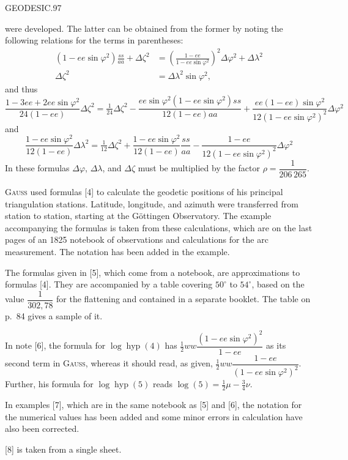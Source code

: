 \clearpage
\noindent\mbox{}\hfill GEODESIC.\hfill 97\par
{\small
\noindent were developed. The latter can be obtained from the former by noting the following relations for the terms in parentheses:
\[
\begin{aligned}
(1-ee\sin\varphi^2)\frac{ss}{aa}+\Delta\zeta^2&=\left(\frac{1-ee}{1-ee\sin\varphi^2}\right)^2\Delta\varphi^2+\Delta\lambda^2\\
\Delta\zeta^2&=\Delta\lambda^2\sin\varphi^2,
\end{aligned}
\]
and thus
\[
\frac{1-3ee+2ee\sin\varphi^2}{24(1-ee)}\Delta\zeta^2=\tfrac1{24}\Delta\zeta^2-\frac{ee\sin\varphi^2(1-ee\sin\varphi^2)ss}{12(1-ee)aa}+\frac{ee(1-ee)\sin\varphi^2}{12(1-ee\sin\varphi^2)^2}\Delta\varphi^2
\]
and
\[
\frac{1-ee\sin\varphi^2}{12(1-ee)}\Delta\lambda^2=\tfrac1{12}\Delta\zeta^2+\frac{1-ee\sin\varphi^2}{12(1-ee)}\frac{ss}{aa}-\frac{1-ee}{12(1-ee\sin\varphi^2)^2}\Delta\varphi^2
\]
In these formulas $\Delta\varphi$, $\Delta\lambda$, and $\Delta\zeta$ must be multiplied by the factor $\rho=\dfrac1{206\,265}$.

\textsc{Gauss} used formulas [4] to calculate the geodetic positions of his principal triangulation stations. Latitude, longitude, and azimuth were transferred from station to station, starting at the Göttingen Observatory. The example accompanying the formulas is taken from these calculations, which are on the last pages of an 1825 notebook of observations and calculations for the arc measurement. The notation has been added in the example.

The formulas given in [5], which come from a notebook, are approximations to formulas [4]. They are accompanied by a table covering $50^\circ$ to $54^\circ$, based on the value $\dfrac1{302{,}78}$ for the flattening and contained in a separate booklet. The table on p.\ 84 gives a sample of it.

In note [6], the formula for $\log\operatorname{hyp}(4)$ has $\tfrac12ww\dfrac{(1-ee\sin\varphi^2)^2}{1-ee}$ as its second term in \textsc{Gauss}, whereas it should read, as given, $\tfrac12ww\dfrac{1-ee}{(1-ee\sin\varphi^2)^2}$. Further, his formula for $\log\operatorname{hyp}(5)$ reads $\log(5)=\tfrac12\mu-\tfrac34\nu$.

In examples [7], which are in the same notebook as [5] and [6], the notation for the numerical values has been added and some minor errors in calculation have also been corrected.

[8] is taken from a single sheet.

}
